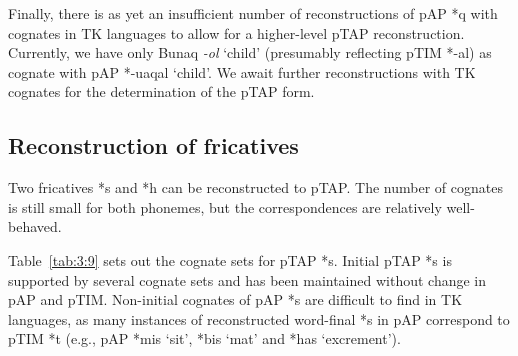 Finally, there is as yet an insufficient number of reconstructions of pAP *q with cognates in TK languages to allow for a higher-level pTAP reconstruction. Currently, we have only Bunaq \textit{{}-ol} `child' (presumably reflecting pTIM *-al) as cognate with pAP *-uaqal `child'. We await further reconstructions with TK cognates for the determination of the pTAP form.

\subsection{Reconstruction of fricatives}
Two fricatives *s and *h can be reconstructed to pTAP. The number of cognates is still small for both phonemes, but the correspondences are relatively well-behaved. 

Table~\ref{tab:3:9} sets out the cognate sets for pTAP *s. Initial pTAP *s is supported by several cognate sets and has been maintained without change in pAP and pTIM. Non-initial cognates of pAP *s are difficult to find in TK languages, as many instances of reconstructed word-final *s in pAP correspond to pTIM *t (e.g., pAP *mis `sit', *bis `mat' and *has `excrement').
 

